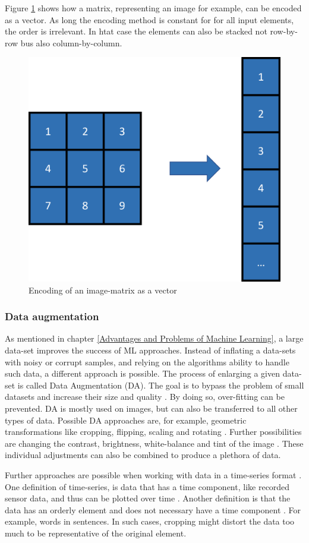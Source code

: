 Figure \ref{fig:encoding} shows how a matrix, representing an image for example, can be encoded as a vector. As long the encoding method is constant for for all input elements, the order is irrelevant. In htat case the elements can also be stacked not row-by-row bus also column-by-column.

\begin{figure}[H]
	\centering
	\includegraphics[width=0.455\linewidth]{IMGs/encoding.png}
	\caption{Encoding of an image-matrix as a vector}
	\label{fig:encoding}
\end{figure}

 
\subsubsection*{Data augmentation}\label{DAUG}
As mentioned in chapter \ref{Advantages and Problems of Machine Learning}, a large data-set improves the success of ML approaches. Instead of inflating a data-sets with noisy or corrupt samples, and relying on the algorithms ability to handle such data, a different approach is possible. The process of enlarging a given data-set is called Data Augmentation (DA). The goal is to bypass the problem of small datasets and increase their size and quality \cite{Shorten}. By doing so, over-fitting can be prevented. DA is mostly used on images, but can also be transferred to all other types of data. Possible DA approaches are, for example, geometric transformations like cropping, flipping, scaling and rotating \cite{Taylor}. Further possibilities are changing the contrast, brightness, white-balance and tint of the image \cite{Mikolajczyk}. These individual adjustments can also be combined to produce a plethora of data.

Further approaches are possible when working with data in a time-series format \cite{Bandara, Wen}. One definition of time-series, is data that has a time component, like recorded sensor data, and thus can be plotted over time \cite{Hamilton}. Another definition is that the data has an orderly element and does not necessary have a time component \cite{Iwana}. For example, words in sentences. In such cases, cropping might distort the data too much to be representative of the original element.

